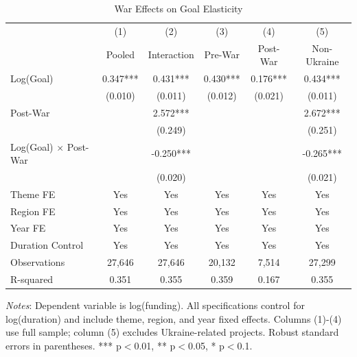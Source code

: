 \begin{table}[htbp]
\centering
\caption{War Effects on Goal Elasticity}
\label{tab:war_elasticity}
\begin{threeparttable}
\small
\begin{tabular}{lccccc}
\toprule
& (1) & (2) & (3) & (4) & (5) \\
& Pooled & Interaction & Pre-War & Post-War & Non-Ukraine \\
\midrule
Log(Goal) & 0.347*** & 0.431*** & 0.430*** & 0.176*** & 0.434*** \\
& (0.010) & (0.011) & (0.012) & (0.021) & (0.011) \\
Post-War & & 2.572*** & & & 2.672*** \\
& & (0.249) & & & (0.251) \\
Log(Goal) $\times$ Post-War & & -0.250*** & & & -0.265*** \\
& & (0.020) & & & (0.021) \\
\midrule
Theme FE & Yes & Yes & Yes & Yes & Yes \\
Region FE & Yes & Yes & Yes & Yes & Yes \\
Year FE & Yes & Yes & Yes & Yes & Yes \\
Duration Control & Yes & Yes & Yes & Yes & Yes \\
\midrule
Observations & 27,646 & 27,646 & 20,132 & 7,514 & 27,299 \\
R-squared & 0.351 & 0.355 & 0.359 & 0.167 & 0.355 \\
\bottomrule
\end{tabular}
\begin{tablenotes}
\small
\item \textit{Notes}: Dependent variable is log(funding). All specifications control for log(duration) and include theme, region, and year fixed effects. Columns (1)-(4) use full sample; column (5) excludes Ukraine-related projects. Robust standard errors in parentheses. *** p$<$0.01, ** p$<$0.05, * p$<$0.1.
\end{tablenotes}
\end{threeparttable}
\end{table}

